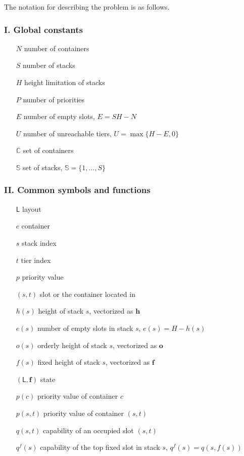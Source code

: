 \documentclass[review,3p,times,12pt,number]{elsarticle}\usepackage{amsmath}\usepackage{amssymb}
\begin{document}
\newlength{\mylongest}
\settowidth{\mylongest}{$\alpha(s^+,s)$}
\addtolength{\mylongest}{\labelsep}

The notation for describing the problem is as follows.

\subsubsection*{I\@. Global constants}

\begin{enumerate}[noitemsep, align=LabelCenter,labelwidth=\mylongest,leftmargin=!]
\item[$N$] number of containers
\item[$S$] number of stacks
\item[$H$] height limitation of stacks
\item[$P$] number of priorities
\item[$E$] number of empty slots, $E=SH-N$
\item[$U$] number of unreachable tiers, $U=\max\{H-E,0\}$
\item[$\mathbb{C}$] set of containers 
\item[$\mathbb{S}$] set of stacks, $\mathbb{S}=\{1,\dots,S\}$ 
\end{enumerate}



\subsubsection*{II\@. Common symbols and functions}
\begin{enumerate}[noitemsep, align=LabelCenter,labelwidth=\mylongest,leftmargin=!]
\item[$\mathsf{L}$] layout
\item[$c$] container
\item[$s$] stack index
\item[$t$] tier index
\item[$p$] priority value
\item[$(s, t)$] slot or the container located in
\item[$h(s)$] height of stack $s$, vectorized as $\boldsymbol{h}$
\item[$e(s)$] number of empty slots in stack $s$, $e(s)=H-h(s)$
\item[$o(s)$] orderly height of stack $s$, vectorized as $\boldsymbol{o}$
\item[$f(s)$] fixed height of stack $s$, vectorized as $\boldsymbol{f}$
\item[$(\mathsf{L},\boldsymbol{f})$] state
\item[$p(c)$] priority value of container $c$
\item[$p(s,t)$] priority value of container $(s,t)$
\item[$q(s,t)$] capability of an occupied slot $(s,t)$
\item[$q^f(s)$] capability of the top fixed slot in stack $s$, $q^f(s)=q(s,f(s))$
\end{enumerate}
\end{document}

